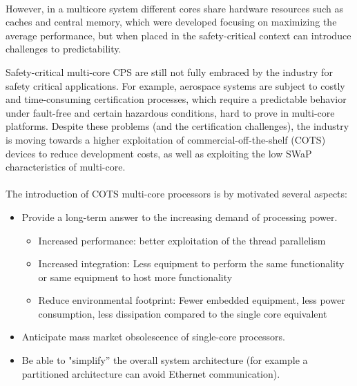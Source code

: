 \paragraph{} However, in a multicore system different cores share hardware resources such as caches and central memory, which were developed focusing on maximizing the average performance, but when placed in the safety-critical context can introduce challenges to predictability.
\par Safety-critical multi-core CPS are still not fully embraced by the industry for safety critical applications. For example, aerospace systems are subject to costly and time-consuming certification processes, which require a predictable behavior under fault-free and certain hazardous conditions, hard to prove in multi-core platforms. Despite these problems (and the certification challenges), the industry is moving towards a higher exploitation of commercial-off-the-shelf (COTS) devices to reduce development costs\cite{mulcors}, as well as exploiting the low SWaP characteristics of multi-core.

\paragraph{} The introduction of COTS multi-core processors is by motivated several aspects:
\begin{itemize}
\item Provide a long-term answer to the increasing demand of processing power.
\begin{itemize}
\item Increased performance: better exploitation of the thread parallelism
\item Increased integration: Less equipment to perform the same functionality or same equipment to
host more functionality
\item Reduce environmental footprint: Fewer embedded equipment, less power consumption, less dissipation compared to
the single core equivalent
\end{itemize}
\item Anticipate mass market obsolescence of single-core processors.
\item Be able to "simplify” the overall system architecture (for example a partitioned architecture can avoid Ethernet communication).
\end{itemize}

